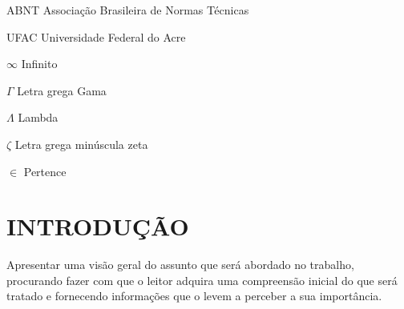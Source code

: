 \documentclass[
    12pt,				       %
    openright,			       %
    oneside,			       %
    a4paper,			       %
    chapter=TITLE,             %
    sumario=tradicional,       %
    english,			        %
    brazil, 				    %
 ]{abntex2}
\begin{document}
\begin{siglas}
	\item[ABNT] Associação Brasileira de Normas Técnicas
	\item[UFAC] Universidade Federal do Acre
\end{siglas}

\begin{simbolos}
    \item[$\infty$ ] Infinito
    \item[$ \Gamma $] Letra grega Gama
    \item[$ \Lambda $] Lambda
    \item[$ \zeta $] Letra grega minúscula zeta
    \item[$ \in $] Pertence
\end{simbolos}

\tableofcontents*
\cleardoublepage


\textual



\pagestyle{simple}


\chapter{\MakeUppercase{Introdução}}\label{sec:introducao}
Apresentar uma visão geral do assunto que será abordado no trabalho, procurando fazer com que o leitor adquira uma compreensão inicial do que será tratado e fornecendo informações que o levem a perceber a sua importância.
\end{document}
